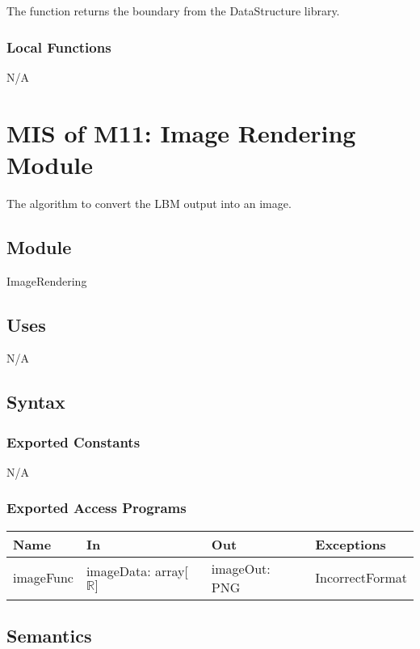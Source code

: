 \documentclass[12pt, titlepage]{article}
\begin{document}
The function returns the boundary from the DataStructure library.

\subsubsection{Local Functions}

N/A

\newpage

\section{MIS of M11: Image Rendering Module} \label{OUModule} 

The algorithm to convert the LBM output into an image.

\subsection{Module}

ImageRendering

\subsection{Uses}

N/A

\subsection{Syntax}

\subsubsection{Exported Constants}
N/A

\subsubsection{Exported Access Programs}

\begin{center}
	\begin{tabular}{p{2cm} p{4cm} p{4cm} p{2cm}}
		\hline
		\textbf{Name} & \textbf{In} & \textbf{Out} & \textbf{Exceptions} \\
		\hline
		imageFunc & imageData: array[$\mathbb{R}]$ & imageOut: PNG & IncorrectFormat \\
		\hline
	\end{tabular}
\end{center}

\subsection{Semantics}
\end{document}
